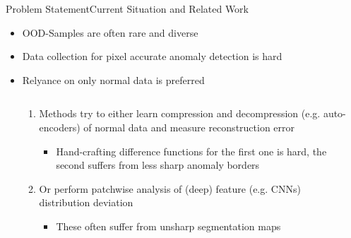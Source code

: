 \begin{frame}{Problem Statement}{Current Situation and Related Work}
    \begin{itemize}
        \item<1-> OOD-Samples are often rare and diverse
        \item<2-> Data collection for pixel accurate anomaly detection is hard
        \item<3-> Relyance on only normal data is preferred
        \begin{columns}
            \begin{column}{0.4\textwidth}
                \begin{enumerate}
                    \item<4-> Methods try to either learn compression and decompression (e.g. auto-encoders) of normal data and measure reconstruction error
                    \begin{itemize}
                        \item<5-> Hand-crafting difference functions for the first one is hard, the second suffers from less sharp anomaly borders
                    \end{itemize}
                    \item<6-> Or perform patchwise analysis of (deep) feature (e.g. CNNs) distribution deviation
                    \begin{itemize}
                        \item<7-> These often suffer from unsharp segmentation maps
                    \end{itemize}
                \end{enumerate}
            \end{column}
                \begin{column}{0.6\textwidth}
\end{column}
\end{columns}
\end{itemize}
\end{frame}
